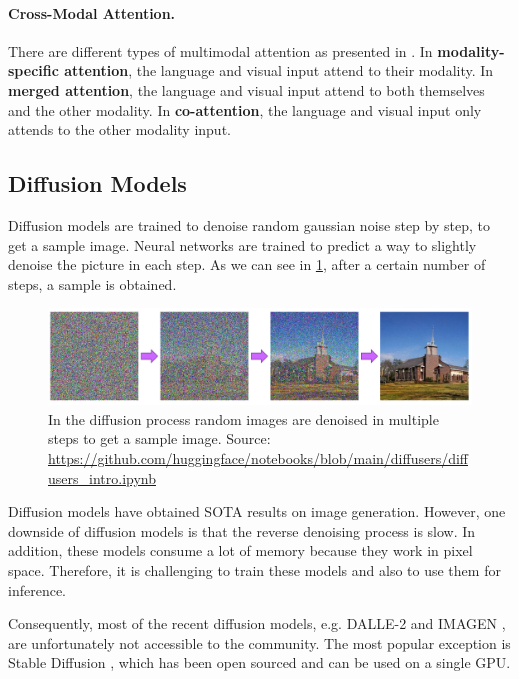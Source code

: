\paragraph{Cross-Modal Attention.} There are different types of multimodal attention as presented in \cite{hendricks2021decoupling}. In \textbf{modality-specific attention}, the language and visual input attend to their modality. In \textbf{merged attention}, the language and visual input attend to both themselves and the other modality. In \textbf{co-attention}, the language and visual input only attends to the other modality input.

\subsection{Diffusion Models} \label{sec:diffusion_models}

Diffusion models are trained to denoise random gaussian noise step by step, to get a sample image. Neural networks are trained to predict a way to slightly denoise the picture in each step. As we can see in \cref{fig:diffusion_process}, after a certain number of steps, a sample is obtained.

\begin{figure}[ht]
    \centering
    \includegraphics[width=\linewidth]{images/diffusion/diffusion-process.png}
    \caption{In the diffusion process random images are denoised in multiple steps to get a sample image. Source: \url{https://github.com/huggingface/notebooks/blob/main/diffusers/diffusers_intro.ipynb}}
    \label{fig:diffusion_process}
\end{figure}

Diffusion models have obtained SOTA results on image generation. However, one downside of diffusion models is that the reverse denoising process is slow. In addition, these models consume a lot of memory because they work in pixel space. Therefore, it is challenging to train these models and also to use them for inference.

Consequently, most of the recent diffusion models, e.g. DALLE-2 \cite{ramesh2022hierarchical} and IMAGEN \cite{saharia2022photorealistic}, are unfortunately not accessible to the community. The most popular exception is Stable Diffusion \cite{rombach2021highresolution}, which has been open sourced and can be used on a single GPU.

